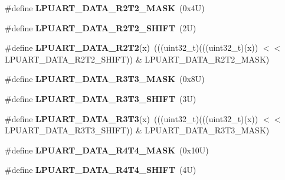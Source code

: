 \begin{DoxyCompactItemize}
\#define {\bfseries L\+P\+U\+A\+R\+T\+\_\+\+D\+A\+T\+A\+\_\+\+R2\+T2\+\_\+\+M\+A\+SK}~(0x4\+U)
\item 
\mbox{\label{group___l_p_u_a_r_t___register___masks_ga870afb7e3eb112288f0ca20e2028634f}} 
\#define {\bfseries L\+P\+U\+A\+R\+T\+\_\+\+D\+A\+T\+A\+\_\+\+R2\+T2\+\_\+\+S\+H\+I\+FT}~(2\+U)
\item 
\mbox{\label{group___l_p_u_a_r_t___register___masks_ga98f1aa1d239a78a87bfa72547016b141}} 
\#define {\bfseries L\+P\+U\+A\+R\+T\+\_\+\+D\+A\+T\+A\+\_\+\+R2\+T2}(x)~(((uint32\+\_\+t)(((uint32\+\_\+t)(x)) $<$$<$ L\+P\+U\+A\+R\+T\+\_\+\+D\+A\+T\+A\+\_\+\+R2\+T2\+\_\+\+S\+H\+I\+FT)) \& L\+P\+U\+A\+R\+T\+\_\+\+D\+A\+T\+A\+\_\+\+R2\+T2\+\_\+\+M\+A\+SK)
\item 
\mbox{\label{group___l_p_u_a_r_t___register___masks_ga0e62af189eaa1f303af9f0d939b647c6}} 
\#define {\bfseries L\+P\+U\+A\+R\+T\+\_\+\+D\+A\+T\+A\+\_\+\+R3\+T3\+\_\+\+M\+A\+SK}~(0x8\+U)
\item 
\mbox{\label{group___l_p_u_a_r_t___register___masks_ga30f17884cd2f8cc4cf198918ef0ffa28}} 
\#define {\bfseries L\+P\+U\+A\+R\+T\+\_\+\+D\+A\+T\+A\+\_\+\+R3\+T3\+\_\+\+S\+H\+I\+FT}~(3\+U)
\item 
\mbox{\label{group___l_p_u_a_r_t___register___masks_ga66b36ecff6c7cf7031f20728f043bd17}} 
\#define {\bfseries L\+P\+U\+A\+R\+T\+\_\+\+D\+A\+T\+A\+\_\+\+R3\+T3}(x)~(((uint32\+\_\+t)(((uint32\+\_\+t)(x)) $<$$<$ L\+P\+U\+A\+R\+T\+\_\+\+D\+A\+T\+A\+\_\+\+R3\+T3\+\_\+\+S\+H\+I\+FT)) \& L\+P\+U\+A\+R\+T\+\_\+\+D\+A\+T\+A\+\_\+\+R3\+T3\+\_\+\+M\+A\+SK)
\item 
\mbox{\label{group___l_p_u_a_r_t___register___masks_ga8382d1825f095e7b44f0268131927c68}} 
\#define {\bfseries L\+P\+U\+A\+R\+T\+\_\+\+D\+A\+T\+A\+\_\+\+R4\+T4\+\_\+\+M\+A\+SK}~(0x10\+U)
\item 
\mbox{\label{group___l_p_u_a_r_t___register___masks_ga04b3055d632d57ab1409655de3049348}} 
\#define {\bfseries L\+P\+U\+A\+R\+T\+\_\+\+D\+A\+T\+A\+\_\+\+R4\+T4\+\_\+\+S\+H\+I\+FT}~(4\+U)

\end{DoxyCompactItemize}
